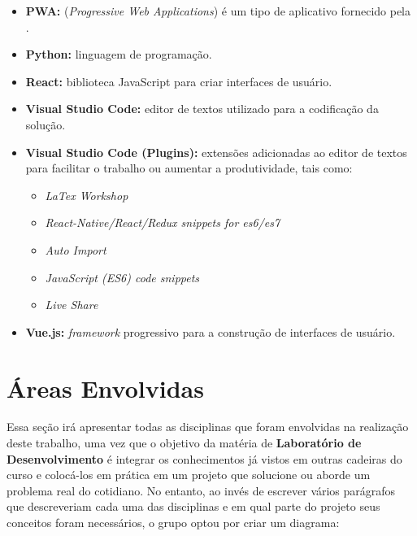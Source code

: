 \begin{itemize}
    \item \textbf{PWA:} (\textit{Progressive Web Applications}) é um tipo de \software{} aplicativo fornecido pela \web{}.
    \item \textbf{Python:} linguagem de programação.
    \item \textbf{React:} biblioteca JavaScript para criar interfaces de usuário.
    \item \textbf{Visual Studio Code:} editor de textos utilizado para a codificação da solução.
    \item \textbf{Visual Studio Code (Plugins):} extensões adicionadas ao editor de textos para facilitar o trabalho ou aumentar a produtividade, tais como:
    \begin{itemize}
        \item \textit{LaTex Workshop}
        \item \textit{React-Native/React/Redux snippets for es6/es7}
        \item \textit{Auto Import}
        \item \textit{JavaScript (ES6) code snippets}
        \item \textit{Live Share}
    \end{itemize}
    \item \textbf{Vue.js:} \textit{framework} progressivo para a construção de interfaces de usuário.
\end{itemize}




\section{Áreas Envolvidas}
\label{sec:areas_envolvidas}

Essa seção irá apresentar todas as disciplinas que foram envolvidas na realização deste trabalho, uma vez que o objetivo da matéria de \textbf{Laboratório de Desenvolvimento} é integrar os conhecimentos já vistos em outras cadeiras do curso e colocá-los em prática em um projeto que solucione ou aborde um problema real do cotidiano. No entanto, ao invés de escrever vários parágrafos que descreveriam cada uma das disciplinas e em qual parte do projeto seus conceitos foram necessários, o grupo optou por criar um diagrama:

